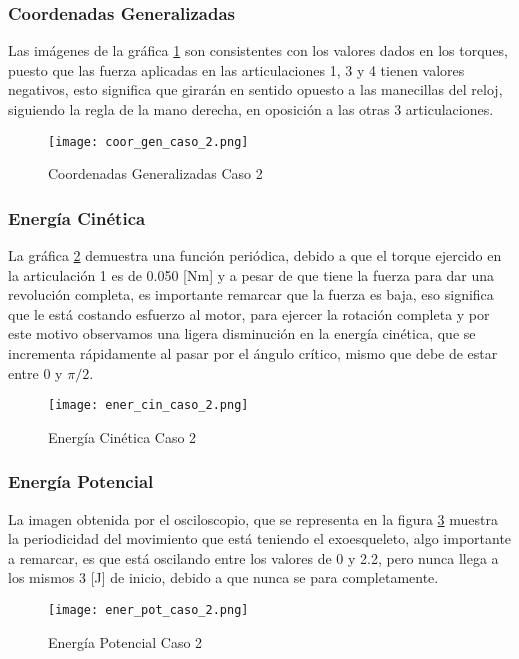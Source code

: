     \subsubsection{Coordenadas Generalizadas}
    Las imágenes de la gráfica \ref{fig:CoordGenC2} son consistentes con los valores dados en los torques, puesto que las fuerza aplicadas en las articulaciones 1, 3 y 4 tienen valores negativos, esto significa que girarán en sentido opuesto a las manecillas del reloj, siguiendo la regla de la mano derecha, en oposición a las otras 3 articulaciones.

    \begin{figure} [H]%
            \centering
            \texttt{[image: coor\_gen\_caso\_2.png]} 
        \caption{Coordenadas Generalizadas Caso 2}
        \label{fig:CoordGenC2}
    \end{figure}

    \subsubsection{Energía Cinética}
    La gráfica \ref{fig:eCinC2} demuestra una función periódica, debido a que el torque ejercido en la articulación 1 es de 0.050 [Nm] y a pesar de que tiene la fuerza para dar una revolución completa, es importante remarcar que la fuerza es baja, eso significa que le está costando esfuerzo al motor, para ejercer la rotación completa y por este motivo observamos una ligera disminución en la energía cinética, que se incrementa rápidamente al pasar por el ángulo crítico, mismo que debe de estar entre 0 y $\pi/2$. 

    \begin{figure} [H]%
            \centering
            \texttt{[image: ener\_cin\_caso\_2.png]} 
        \caption{Energía Cinética Caso 2}
        \label{fig:eCinC2}
    \end{figure}

    \subsubsection{Energía Potencial}
    La imagen obtenida por el osciloscopio, que se representa en la figura \ref{fig:ePotC2}  muestra la periodicidad del movimiento que está teniendo el exoesqueleto, algo importante a remarcar, es que está oscilando entre los valores de 0 y 2.2, pero nunca llega a los mismos 3 [J] de inicio, debido a que nunca se para completamente.

    \begin{figure} [H]%
            \centering
            \texttt{[image: ener\_pot\_caso\_2.png]} 
        \caption{Energía Potencial Caso 2}
        \label{fig:ePotC2}
    \end{figure}

